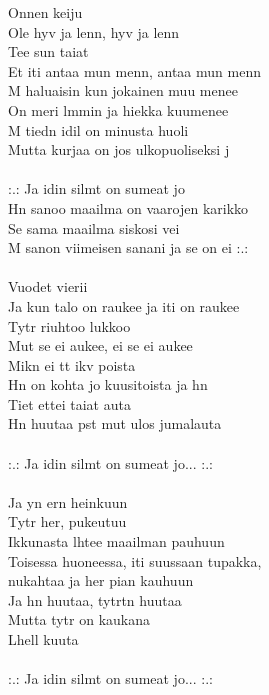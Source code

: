 
Onnen keiju \\
Ole hyv ja lenn, hyv ja lenn \\
Tee sun taiat \\
Et iti antaa mun menn, antaa mun menn \\
M haluaisin kun jokainen muu menee \\
On meri lmmin ja hiekka kuumenee \\
M tiedn idil on minusta huoli \\
Mutta kurjaa on jos ulkopuoliseksi j \\
\hspace{10mm} \\
:.: Ja idin silmt on sumeat jo \\
Hn sanoo maailma on vaarojen karikko \\
Se sama maailma siskosi vei \\
M sanon viimeisen sanani ja se on ei :.: \\
\hspace{10mm} \\
Vuodet vierii \\
Ja kun talo on raukee ja iti on raukee \\
Tytr riuhtoo lukkoo \\
Mut se ei aukee, ei se ei aukee \\
Mikn ei tt ikv poista \\
Hn on kohta jo kuusitoista ja hn \\
Tiet ettei taiat auta \\
Hn huutaa pst mut ulos jumalauta \\
\hspace{10mm} \\
:.: Ja idin silmt on sumeat jo... :.: \\
\hspace{10mm} \\
Ja yn ern heinkuun \\
Tytr her, pukeutuu \\
Ikkunasta lhtee maailman pauhuun \\
Toisessa huoneessa, iti suussaan tupakka, \\
nukahtaa ja her pian kauhuun \\
Ja hn huutaa, tytrtn huutaa \\
Mutta tytr on kaukana \\
Lhell kuuta \\
\hspace{10mm} \\
:.: Ja idin silmt on sumeat jo... :.: \\
